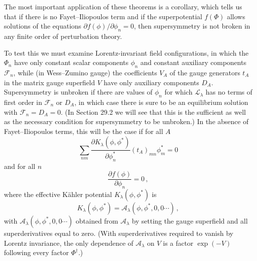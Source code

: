 The most important application of these theorems is a corollary, which tells
us that if there is no Fayet--Iliopoulos term and if the superpotential
\(f(\Phi)\) allows solutions of the equations
\(\partial f(\phi)/\partial\phi_n=0\), then supersymmetry is not broken in
any finite order of perturbation theory.

To test this we must examine Lorentz-invariant field configurations, in which
the \(\Phi_n\) have only constant scalar components \(\phi_n\) and constant
auxiliary components \(\mathcal{F}_n\), while (in Wess--Zumino gauge) the
coefficients \(V_A\) of the gauge generators \(t_A\) in the matrix gauge
superfield \(V\) have only auxiliary components \(D_A\). Supersymmetry is
unbroken if there are values of \(\phi_n\) for which
\(\mathcal{L}_\lambda\) has no terms of first order in \(\mathcal{F}_n\) or
\(D_A\), in which case there is sure to be an equilibrium solution with
\(\mathcal{F}_n=D_A=0\). (In Section 29.2 we will see that this is the
sufficient as well as the necessary condition for supersymmetry to be
unbroken.) In the absence of Fayet--Iliopoulos terms, this will be the case
if for all \(A\)
\begin{equation}
  \sum_{nm}
  \frac{\partial K_\lambda(\phi,\phi^*)}{\partial\phi_n^*}
  (t_A)_{mn}\phi_m^*
  =0
  \tag{27.6.17}\label{eq:27.6.17}
\end{equation}
and for all \(n\)
\begin{equation}
  \frac{\partial f(\phi)}{\partial\phi_n}=0\,,
  \tag{27.6.18}\label{eq:27.6.18}
\end{equation}
where the effective K\"ahler potential \(K_\lambda(\phi,\phi^*)\) is
\begin{equation}
  K_\lambda(\phi,\phi^*)
  =
  \mathcal{A}_\lambda(\phi,\phi^*,0,0\cdots)\,,
  \tag{27.6.19}\label{eq:27.6.19}
\end{equation}
with \(\mathcal{A}_\lambda(\phi,\phi^*,0,0\cdots)\) obtained from
\(\mathcal{A}_\lambda\) by setting the gauge superfield and all
superderivatives equal to zero. (With superderivatives required to vanish by
Lorentz invariance, the only dependence of \(\mathcal{A}_\lambda\) on \(V\)
is a factor \(\exp(-V)\) following every factor \(\Phi^\dagger\).)

